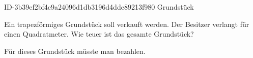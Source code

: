 \begin{exercise}
      {ID-3b39ef2bf4c9a24096d1db3196d4dde89213f980}
      {Grundstück}
  \ifproblem\problem
    \begin{minipage}[c]{0.38\textwidth}
      \centering
    \end{minipage}\hfill
    \begin{minipage}[c]{0.6\textwidth}
      Ein trapezförmiges Grundstück soll verkauft werden. Der Besitzer verlangt
       für einen Quadratmeter. Wie teuer ist das gesamte Grundstück?
    \end{minipage}
  \fi
  \ifoutcome\outcome
    Für dieses Grundstück müsste man  bezahlen.
  \fi
\end{exercise}

